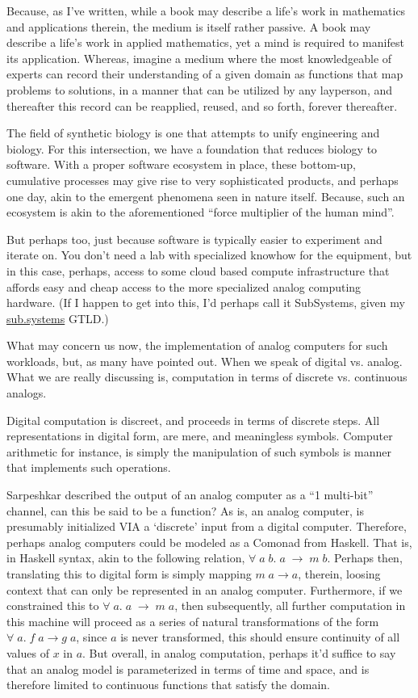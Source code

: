 Because, as I've written, while a book may describe a life’s work in mathematics and applications therein, the medium is itself rather passive. A book may describe a life’s work in applied mathematics, yet a mind is required to manifest its application. Whereas, imagine a medium where the most knowledgeable of experts can record their understanding of a given domain as functions that map problems to solutions, in a manner that can be utilized by any layperson, and thereafter this record can be reapplied, reused, and so forth, forever thereafter.

The field of synthetic biology is one that attempts to unify engineering and biology. For this intersection, we have a foundation that reduces biology to software. With a proper software ecosystem in place, these bottom-up, cumulative processes may give rise to very sophisticated products, and perhaps one day, akin to the emergent phenomena seen in nature itself. Because, such an ecosystem is akin to the aforementioned ``force multiplier of the human mind''.

But perhaps too, just because software is typically easier to experiment and iterate on. You don't need a lab with specialized knowhow for the equipment, but in this case, perhaps, access to some cloud based compute infrastructure that affords easy and cheap access to the more specialized analog computing hardware. (If I happen to get into this, I'd perhaps call it SubSystems, given my \url{sub.systems} GTLD.)

What may concern us now, the implementation of analog computers for such workloads, but, as many have pointed out. When we speak of digital vs. analog. What we are really discussing is, computation in terms of discrete vs. continuous analogs. 

Digital computation is discreet, and proceeds in terms of discrete steps. All representations in digital form, are mere, and meaningless symbols. Computer arithmetic for instance, is simply the manipulation of such symbols is manner that implements such operations.

Sarpeshkar described the output of an analog computer as a ``1 multi-bit'' channel, can this be said to be a function? As is, an analog computer, is presumably initialized VIA a `discrete' input from a digital computer. Therefore, perhaps analog computers could be modeled as a Comonad from Haskell. That is, in Haskell syntax, akin to the following relation, $\forall\;a\;b.\;a\;\to\;m\;b$. Perhaps then, translating this to digital form is simply mapping $m\;a \to a$, therein, loosing context that can only be represented in an analog computer. Furthermore, if we constrained this to $\forall\;a.\;a\;\to\;m\;a$, then subsequently, all further computation in this machine will proceed as a series of natural transformations of the form $\forall\;a.\;f\;a \to g\;a$, since $a$ is never transformed, this should ensure continuity of all values of $x$ in $a$. But overall, in analog computation, perhaps it'd suffice to say that an analog model is parameterized in terms of time and space, and is therefore limited to continuous functions that satisfy the domain. 

